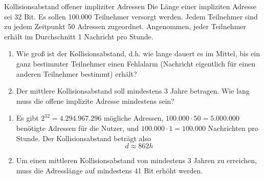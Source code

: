 \documentclass{article}
\begin{document}
\begin{exercise}{Kollisionsabstand offener impliziter Adressen}
  Die Länge einer impliziten Adresse sei 32 Bit. Es sollen 100.000 Teilnehmer versorgt werden. Jedem Teilnehmer sind zu jedem Zeitpunkt 50 Adressen zugeordnet. Angenommen, jeder Teilnehmer erhält im Durchschnitt 1 Nachricht pro Stunde.
  \begin{enumerate}
    \item Wie groß ist der Kollisionsabstand, d.h. wie lange dauert es im Mittel, bis ein ganz bestimmter Teilnehmer einen Fehlalarm (Nachricht eigentlich für einen anderen Teilnehmer bestimmt) erhält?
    \item Der mittlere Kollisionsabstand soll mindestens 3 Jahre betragen. Wie lang muss die offene implizite Adresse mindestens sein?
  \end{enumerate}

  \begin{solution}
    \begin{enumerate}
      \item Es gibt $2^{32}=4.294.967.296$ mögliche Adressen, $100.000 \cdot 50 = 5.000.000$ benötigte Adressen für die Nutzer, und $100.000 \cdot 1 = 100.000$ Nachrichten pro Stunde. Der Kollisionsabstand beträgt also
        \[ d \approx 862h \]
      \item Um einen mittleren Kollisionsabstand von mindestens 3 Jahren zu erreichen, muss die Adresslänge auf mindestens 41 Bit erhöht werden.
    \end{enumerate}
  \end{solution}
\end{exercise}
\end{document}
